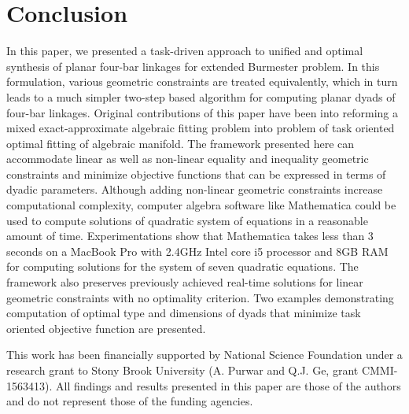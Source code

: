 \documentclass[twocolumn,10pt]{asme2ej}
\begin{document}
\section*{Conclusion}
In this paper, we presented a task-driven approach to unified and optimal synthesis of planar four-bar linkages for extended Burmester problem. In this formulation, various geometric constraints are treated equivalently, which in turn leads to a much simpler two-step based algorithm for computing planar dyads of four-bar linkages. Original contributions of this paper have been into reforming a mixed exact-approximate algebraic fitting problem into problem of task oriented optimal fitting of algebraic manifold. The framework presented here can accommodate linear as well as non-linear equality and inequality geometric constraints and minimize objective functions that can be expressed in terms of dyadic parameters. Although adding non-linear geometric constraints increase computational complexity, computer algebra software like Mathematica could be used to compute solutions of quadratic system of equations in a reasonable amount of time. Experimentations show that Mathematica takes less than 3 seconds on a MacBook Pro with 2.4GHz Intel core i5 processor and 8GB RAM for computing solutions for the system of seven quadratic equations. The framework also preserves previously achieved real-time solutions for linear geometric constraints with no optimality criterion. Two examples demonstrating computation of optimal type and dimensions of dyads that minimize task oriented objective function are presented.

\begin{acknowledgment}
This work has been financially supported by National Science Foundation under a research grant to Stony Brook University (A. Purwar and Q.J. Ge, grant CMMI-1563413). All findings and results presented in this paper are those of the authors and do not represent those of the funding agencies.
\end{acknowledgment}



\newpage
\clearpage
\listoftables
\listoffigures
\end{document}
